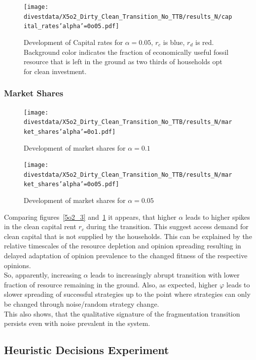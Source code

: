 \begin{figure}[H]
	\centering
	\texttt{[image: divestdata/X5o2\_Dirty\_Clean\_Transition\_No\_TTB/results\_N/capital\_rates'alpha'=0o05.pdf]}
	\caption{Development of Capital rates for $\alpha=0.05$, $r_c$ is blue, $r_d$ is red. Background color indicates the fraction of economically useful fossil resource that is left in the ground as two thirds of households opt for clean investment.}
	\label{5o2_4}
\end{figure}
\subsubsection{Market Shares}
\begin{figure}[H]
	\centering
	\texttt{[image: divestdata/X5o2\_Dirty\_Clean\_Transition\_No\_TTB/results\_N/market\_shares'alpha'=0o1.pdf]}
	\caption{Development of market shares for $\alpha=0.1$}

\end{figure}

\begin{figure}[H]
	\centering
	\texttt{[image: divestdata/X5o2\_Dirty\_Clean\_Transition\_No\_TTB/results\_N/market\_shares'alpha'=0o05.pdf]}
	\caption{Development of market shares for $\alpha=0.05$}

\end{figure}
Comparing figures~\ref{5o2_3} and~\ref{5o2_4} it appears, that higher $\alpha$ leads to higher spikes in the clean capital rent $r_c$ during the transition. This suggest access demand for clean capital that is not supplied by the households. This can be explained by the relative timescales of the resource depletion and opinion spreading resulting in delayed adaptation of opinion prevalence to the changed fitness of the respective opinions.\\
So, apparently, increasing $\alpha$ leads to increasingly abrupt transition with lower fraction of resource remaining in the ground. Also, as expected, higher $\varphi$ leads to slower spreading of successful strategies up to the point where strategies can only be changed through noise/random strategy change. \\
This also shows, that the qualitative signature of the fragmentation transition persists even with noise prevalent in the system.

\subsection{Heuristic Decisions Experiment}

